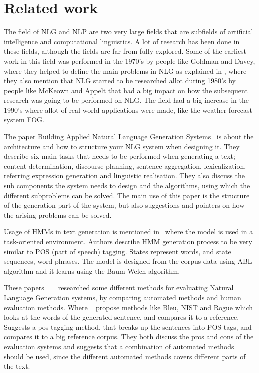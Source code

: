 \documentclass[a4paper,12pt]{article}
\begin{document}
\section{Related work}
\label{sec:relwork}

The field of NLG and NLP are two very large fields that are subfields of
artificial intelligence and computational linguistics. A lot of research has
been done in these fields, although the fields are far from fully explored. Some
of the earliest work in this field was performed in the 1970's by people like
Goldman and Davey, where they helped to define the main problems in NLG 
as explained in \cite[p.~19-20]{buildingNLG}, where they also mention that NLG
started to be researched allot during 1980's by people like McKeown and Appelt
that had a big impact on how the subsequent research was going to be performed on NLG.
The field had a big increase in the 1990's where allot of real-world applications were made,
like the weather forecast system FOG.

The paper Building Applied Natural Language Generation
Systems~\cite{nlgsystem01} is about the architecture and how to structure your
NLG system when designing it. They describe six main tasks that needs to be
performed when generating a text; content determination, discourse planning,
sentence aggregation, lexicalization, referring expression generation and
linguistic realisation. They also discuss the sub components the system
needs to design and the algorithms, using which the different subproblems can be
solved. The main use of this paper is the structure of the generation part of
the system, but also suggestions and pointers on how the arising problems can be
solved.

Usage of HMMs in text generation is mentioned in~\cite{hmmnlg} where the model
is used in a task-oriented environment. Authors describe HMM generation process
to be very similar to POS (part of speech) tagging. States represent words, and
state sequences, word phrases. The model is designed from the corpus data
using ABL algorithm and it learns using the Baum-Welch algorithm.

These papers  ~\cite{poseval} ~\cite{bleueval} researched some different methods for evaluating Natural Language Generation systems, by comparing automated methods and human evaluation methods. Where  ~\cite{bleueval} propose methods like Bleu, NIST and Rogue which looks at the words of the generated sentence, and compares it to a reference. ~\cite{poseval} Suggests a pos tagging method, that breaks up the sentences into POS tags, and compares it to a big reference corpus.
They both discuss the pros and cons of the evaluation systems and suggests that a combination of automated methods should be used, since the different automated methods covers different parts of the text.
\end{document}
